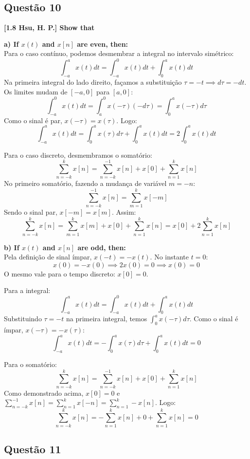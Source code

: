 \subsection{Questão 10}\label{questuxe3o-10}

\textbf{{[}1.8 Hsu, H. P.{]} Show that}

\textbf{a) If \(x(t)\) and \(x[n]\) are even, then:}\\
Para o caso contínuo, podemos desmembrar a integral no intervalo simétrico:
\[\int_{-a}^{a} x(t)dt = \int_{-a}^{0} x(t)dt + \int_{0}^{a} x(t)dt\]
Na primeira integral do lado direito, façamos a substituição \(\tau = -t \implies d\tau = -dt\). Os limites mudam de \([-a, 0]\) para \([a, 0]\):
\[\int_{-a}^{0} x(t)dt = \int_{a}^{0} x(-\tau)(-d\tau) = \int_{0}^{a} x(-\tau)d\tau\]
Como o sinal é par, \(x(-\tau) = x(\tau)\). Logo:
\[\int_{-a}^{a} x(t)dt = \int_{0}^{a} x(\tau)d\tau + \int_{0}^{a} x(t)dt = 2\int_{0}^{a} x(t)dt\]

Para o caso discreto, desmembramos o somatório:
\[\sum_{n=-k}^{k} x[n] = \sum_{n=-k}^{-1} x[n] + x[0] + \sum_{n=1}^{k} x[n]\]
No primeiro somatório, fazendo a mudança de variável \(m = -n\):
\[\sum_{n=-k}^{-1} x[n] = \sum_{m=1}^{k} x[-m]\]
Sendo o sinal par, \(x[-m] = x[m]\). Assim:
\[\sum_{n=-k}^{k} x[n] = \sum_{m=1}^{k} x[m] + x[0] + \sum_{n=1}^{k} x[n] = x[0] + 2\sum_{n=1}^{k} x[n]\]

\textbf{b) If \(x(t)\) and \(x[n]\) are odd, then:}\\
Pela definição de sinal ímpar, \(x(-t) = -x(t)\). No instante \(t=0\):
\[x(0) = -x(0) \implies 2x(0) = 0 \implies x(0) = 0\]
O mesmo vale para o tempo discreto: \(x[0] = 0\).

Para a integral:
\[\int_{-a}^{a} x(t)dt = \int_{-a}^{0} x(t)dt + \int_{0}^{a} x(t)dt\]
Substituindo \(\tau = -t\) na primeira integral, temos \(\int_{0}^{a} x(-\tau)d\tau\). Como o sinal é ímpar, \(x(-\tau) = -x(\tau)\):
\[\int_{-a}^{a} x(t)dt = -\int_{0}^{a} x(\tau)d\tau + \int_{0}^{a} x(t)dt = 0\]

Para o somatório:
\[\sum_{n=-k}^{k} x[n] = \sum_{n=-k}^{-1} x[n] + x[0] + \sum_{n=1}^{k} x[n]\]
Como demonstrado acima, \(x[0]=0\) e \(\sum_{n=-k}^{-1} x[n] = \sum_{n=1}^{k} x[-n] = \sum_{n=1}^{k} -x[n]\). Logo:
\[\sum_{n=-k}^{k} x[n] = -\sum_{n=1}^{k} x[n] + 0 + \sum_{n=1}^{k} x[n] = 0\]

\subsection{Questão 11}\label{questuxe3o-11}

